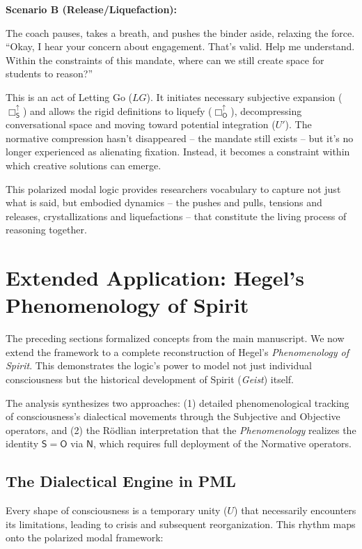 \documentclass[12pt]{book}
\newcommand{\SBoxUp}{\Box_{\mathsf{S}}^{\uparrow}}
\newcommand{\OBoxUp}{\Box_{\mathsf{O}}^{\uparrow}}
\begin{document}
\textbf{Scenario B (Release/Liquefaction):}

The coach pauses, takes a breath, and pushes the binder aside, relaxing the force. ``Okay, I hear your concern about engagement. That's valid. Help me understand. Within the constraints of this mandate, where can we still create space for students to reason?''

This is an act of Letting Go ($LG$). It initiates necessary subjective expansion ($\SBoxUp$) and allows the rigid definitions to liquefy ($\OBoxUp$), decompressing conversational space and moving toward potential integration ($U'$). The normative compression hasn't disappeared -- the mandate still exists -- but it's no longer experienced as alienating fixation. Instead, it becomes a constraint within which creative solutions can emerge.

This polarized modal logic provides researchers vocabulary to capture not just what is said, but embodied dynamics -- the pushes and pulls, tensions and releases, crystallizations and liquefactions -- that constitute the living process of reasoning together.

\section{Extended Application: Hegel's Phenomenology of Spirit}

The preceding sections formalized concepts from the main manuscript. We now extend the framework to a complete reconstruction of Hegel's \emph{Phenomenology of Spirit}. This demonstrates the logic's power to model not just individual consciousness but the historical development of Spirit (\emph{Geist}) itself.

The analysis synthesizes two approaches: (1) detailed phenomenological tracking of consciousness's dialectical movements through the Subjective and Objective operators, and (2) the Rödlian interpretation that the \emph{Phenomenology} realizes the identity $\mathsf{S} = \mathsf{O}$ via $\mathsf{N}$, which requires full deployment of the Normative operators.

\subsection{The Dialectical Engine in PML}

Every shape of consciousness is a temporary unity ($U$) that necessarily encounters its limitations, leading to crisis and subsequent reorganization. This rhythm maps onto the polarized modal framework:
\end{document}
